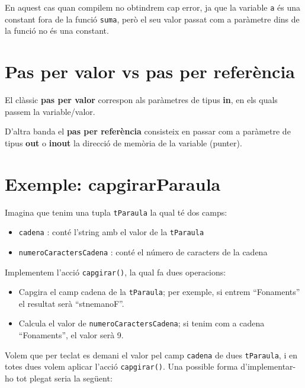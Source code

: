 \documentclass[
]{book}
\providecommand{\tightlist}{%
  \setlength{\itemsep}{0pt}\setlength{\parskip}{0pt}}
\begin{document}
En aquest cas quan compilem no obtindrem cap error, ja que la variable \texttt{a} és una constant fora de la funció \texttt{suma}, però el seu valor passat com a paràmetre dins de la funció no és una constant.

\hypertarget{pas-per-valor-vs-pas-per-referuxe8ncia}{%
\section{Pas per valor vs pas per referència}\label{pas-per-valor-vs-pas-per-referuxe8ncia}}

El clàssic \textbf{pas per valor} correspon als paràmetres de tipus \textbf{in}, en els quals passem la variable/valor.

D'altra banda el \textbf{pas per referència} consisteix en passar com a paràmetre de tipus \textbf{out} o \textbf{inout} la direcció de memòria de la variable (punter).

\hypertarget{exemple-capgirarparaula}{%
\section{Exemple: capgirarParaula}\label{exemple-capgirarparaula}}

Imagina que tenim una tupla \texttt{tParaula} la qual té dos camps:

\begin{itemize}
\tightlist
\item
  \texttt{cadena} : conté l'string amb el valor de la \texttt{tParaula}
\item
  \texttt{numeroCaractersCadena} : conté el número de caracters de la cadena
\end{itemize}

Implementem l'acció \texttt{capgirar()}, la qual fa dues operacions:

\begin{itemize}
\tightlist
\item
  Capgira el camp cadena de la \texttt{tParaula}; per exemple, si entrem ``Fonaments'' el resultat serà ``stnemanoF''.
\item
  Calcula el valor de \texttt{numeroCaractersCadena}; si tenim com a cadena ``Fonaments'', el valor serà 9.
\end{itemize}

Volem que per teclat es demani el valor pel camp \texttt{cadena} de dues \texttt{tParaula}, i en totes dues volem aplicar l'acció \texttt{capgirar()}. Una possible forma d'implementar-ho tot plegat seria la següent:
\end{document}
